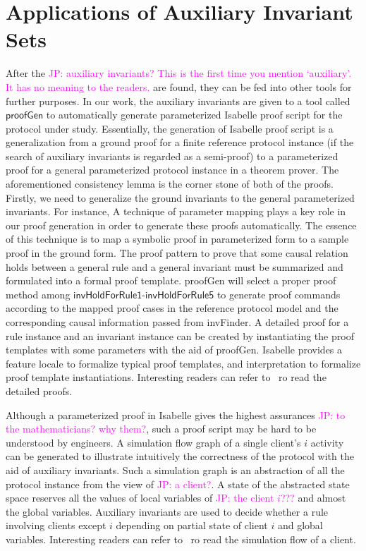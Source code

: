\documentclass{llncs}
\newcommand\JP[1]{\textcolor{magenta}{JP: #1}}
\begin{document}
\section{Applications of Auxiliary Invariant Sets}
 After the \JP{auxiliary invariants? This is the first time you mention `auxiliary'. It has no meaning to the readers.} are found,
 they can be fed into other
tools for further purposes. In our work, the auxiliary invariants
are given to a tool called $\mathsf{proofGen}$ to automatically
generate parameterized Isabelle proof script for the protocol under
study. Essentially, the generation of Isabelle proof script is a
generalization from a ground proof for a finite reference protocol
instance (if the search of auxiliary invariants is regarded as a
semi-proof) to a parameterized proof for a general parameterized
protocol instance in a theorem prover. The aforementioned
consistency lemma is the corner stone of both of the proofs. Firstly,
we need to generalize the ground invariants to the general
parameterized invariants. For instance,
 A technique of parameter mapping plays a key role in our proof generation in order to
generate these proofs automatically. The essence of this technique
is to map a symbolic proof in parameterized form to a sample proof
in the ground form. The proof pattern to prove that some causal
relation holds between a general rule and a general invariant must
be summarized and formulated into a formal proof template.
%
{\sf proofGen} will select a proper proof method among
$\mathsf{invHoldForRule1}$-$\mathsf{invHoldForRule5}$ to generate
proof commands according to the mapped proof cases in the reference
protocol model and the corresponding causal information passed from
{\sf invFinder}. A detailed proof for a rule instance and an
invariant instance can be created by instantiating the proof
templates with some parameters with the aid of {\sf proofGen}.
Isabelle provides a feature {\sf locale} to formalize typical proof
templates, and {\sf interpretation} to formalize proof template
instantiations. Interesting readers can refer to~\cite{LiCache13} ro
read the detailed proofs.

Although a parameterized proof in Isabelle gives the highest
assurances \JP{to the mathematicians? why them?}, such a proof
script may be hard to be understood by engineers. A simulation flow
graph of a single client's $i$ activity can be generated to
illustrate intuitively the correctness of the protocol with the aid
of auxiliary invariants. Such a simulation graph is an abstraction
of all the protocol instance from the view of \JP{a client?}. A
state of the abstracted state space reserves all the values of local
variables of \JP{the client $i$???} and almost the global variables.
Auxiliary invariants are used to decide whether a rule involving
clients except $i$ depending on partial state of client $i$ and
global variables. Interesting readers can refer to~\cite{LiCache14}
ro read the simulation flow of a client.
\end{document}
